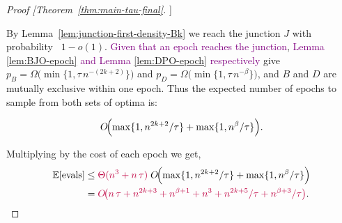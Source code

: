 \documentclass[lettersize,journal]{IEEEtran}
\newcommand{\rerev}[1]{\textcolor{purple}{#1}}
\newcommand{\EE}{\mathbb{E}}
\begin{document}
\begin{proof}[Proof [Theorem~\ref{thm:main-tau-final}]]
	
	By Lemma~\ref{lem:junction-first-density-Bk} we reach the junction $J$ with probability \ \(1-o(1)\).
	\rerev{Given that an epoch reaches the junction}, %
	\rerev{Lemma \ref{lem:BJO-epoch}  and Lemma \ref{lem:DPO-epoch} respectively} give
	$p_B=\Omega\!\bigl(\min\{1,\tau\,n^{-(2k+2)}\}\bigr)$ and
	$p_D=\Omega\!\bigl(\min\{1,\tau\,n^{-\beta}\}\bigr)$,
	and \(B\) and \(D\) are mutually exclusive within one epoch. Thus the expected number of epochs to sample from both sets of optima is:
	
	\[
	O\!\Bigl(
	\max\{1,n^{2k+2}/\tau\}
	+\max\{1,n^{\beta}/\tau\}
	\Bigr).
	\]
	
	Multiplying by the cost of each epoch we get,
	\begin{align*}
		\EE[\text{evals}]
		&\le
		\rerev{\Theta(n^3+n\,\tau)}\;
		O\!\Bigl(
		\max\{1,n^{2k+2}/\tau\}
		+\max\{1,n^{\beta}/\tau\}
		\Bigr)
		\\&=
		\rerev{O\!\bigl(
		n\,\tau
		+n^{2k+3}
		+n^{\beta+1}
		+n^3
		+n^{2k+5}/\tau
		+n^{\beta+3}/\tau
		\bigr)}.
	\end{align*}
\end{proof}
\end{document}
